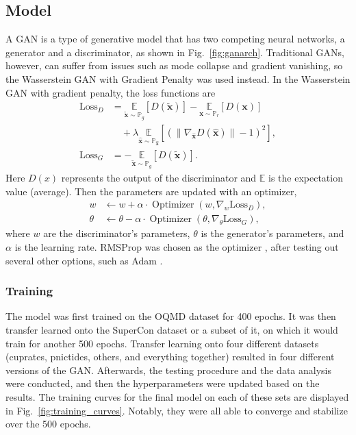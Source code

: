 \subsection{Model}

    
A GAN is a type of generative model that has two competing neural networks, a generator and a discriminator, as shown in Fig.~\ref{fig:ganarch}. Traditional GANs, however, can suffer from issues such as mode collapse and gradient vanishing, so the Wasserstein GAN with Gradient Penalty \cite{DBLP:journals/corr/GulrajaniAADC17} was used instead. In the Wasserstein GAN with gradient penalty, the loss functions are
\begin{align}
    \mathrm{Loss}_D &= \underset{\boldsymbol{\tilde{x}} \sim \mathbb P_g}{\mathbb E} [D ( \boldsymbol{\tilde{x}})] - \underset{\boldsymbol{x} \sim \mathbb P_r}{\mathbb E} [D(\boldsymbol{x})]\\ &\quad + \lambda \underset{\boldsymbol{\hat{x}} \sim \mathbb P_{\boldsymbol{\hat x}}}{\mathbb E} [(\| \nabla_{\boldsymbol{\hat x}} D(\hat{\boldsymbol x}) \| - 1)^2], \nonumber \\
    \mathrm{Loss}_G &= - \underset{\boldsymbol{\tilde{x}} \sim \mathbb P_g}{\mathbb E} [D ( \boldsymbol{\tilde{x}})].
\end{align}
Here $D(x)$ represents the output of the discriminator and $\mathbb{E}$ is the expectation value (average). Then the parameters are updated with an optimizer,
\begin{align}
            w &\leftarrow w + \alpha  \cdot \operatorname{Optimizer}(w,\nabla_w \mathrm{Loss}_D),\\
            \theta &\leftarrow \theta - \alpha \cdot \operatorname{Optimizer}(\theta,\nabla_\theta \mathrm{Loss}_G),
\end{align}
where $w$ are the discriminator's parameters, $\theta$ is the generator's parameters, and $\alpha$ is the learning rate. RMSProp was chosen as the optimizer \cite{hintonrmsprop}, after testing out several other options, such as Adam \cite{kingma2014adam}.

\subsubsection{Training}
The model was first trained on the OQMD dataset for 400 epochs. It was then transfer learned onto the SuperCon dataset or a subset of it, on which it would train for another 500 epochs. Transfer learning onto four different datasets (cuprates, pnictides, others, and everything together) resulted in four different versions of the GAN. Afterwards, the testing procedure and the data analysis were conducted, and then the hyperparameters were updated based on the results. The training curves for the final model on each of these sets are displayed in Fig.~\ref{fig:training_curves}. Notably, they were all able to converge and stabilize over the 500 epochs.

